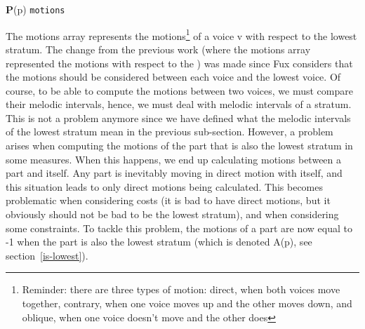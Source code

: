 \vspace{.5cm}
\noindent \textbf{P}(p) \hspace*{.2cm} \texttt{motions}

The motions array represents the motions\footnote{Reminder: there are three types of motion: direct, when both voices move together, contrary, when one voice moves up and the other moves down, and oblique, when one voice doesn't move and the other does} of a voice v with respect to the lowest stratum. The change from the previous work (where the motions array represented the motions with respect to the \cf) was made since Fux considers that the motions should be considered between each voice and the lowest voice. Of course, to be able to compute the motions between two voices, we must compare their melodic intervals, hence, we must deal with melodic intervals of a stratum. This is not a problem anymore since we have defined what the melodic intervals of the lowest stratum mean in the previous sub-section.
However, a problem arises when computing the motions of the part that is also the lowest stratum in some measures. When this happens, we end up calculating motions between a part and itself. Any part is inevitably moving in direct motion with itself, and this situation leads to only direct motions being calculated. This becomes problematic when considering costs (it is bad to have direct motions, but it obviously should not be bad to be the lowest stratum), and when considering some constraints. To tackle this problem, the motions of a part are now equal to -1 when the part is also the lowest stratum (which is denoted A(p), see section~\ref{is-lowest}). 

